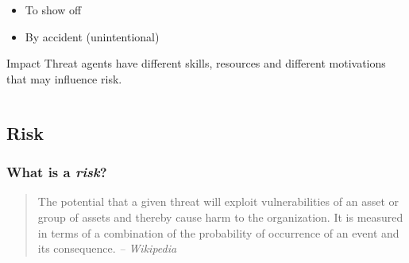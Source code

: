 \begin{frame}
{\begin{scriptsize}
\begin{columns}
\begin{column}{0.5\linewidth}
\begin{itemize}
\begin{itemize}
	\item information
	\item competition
	\end{itemize}
\item To show off
\item By accident (unintentional)
\end{itemize}
\begin{block}{Impact}
Threat agents have different skills, resources and different motivations that
may influence risk.
\end{block}
\end{column}
\end{columns}
\end{scriptsize}
}
\end{frame}

\subsection{Risk}

\begin{frame}
\frametitle{What is a \emph{risk}?}
\begin{quote}
The potential that a given threat will exploit vulnerabilities of
an asset or group of assets and thereby cause harm to the organization. It
is measured in terms of a combination of the probability of occurrence of an
event and its consequence.
\textit{-- Wikipedia}
\end{quote}
\end{frame}

